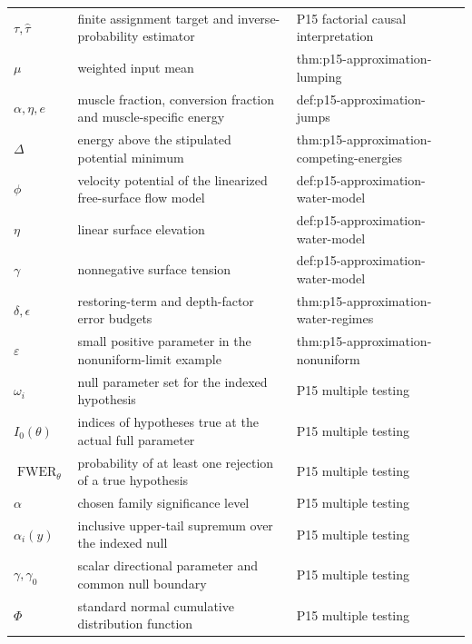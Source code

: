 \begin{longtable}{@{}p{}p{}p{}@{}}
\(\tau,\allowbreak \widehat\tau\) & finite assignment target and inverse-probability estimator & P15 factorial causal interpretation \\
\(\mu\) & weighted input mean & thm:\allowbreak{}p15-\allowbreak{}approximation-\allowbreak{}lumping \\
\(\alpha,\allowbreak \eta,\allowbreak e\) & muscle fraction, conversion fraction and muscle-specific energy & def:\allowbreak{}p15-\allowbreak{}approximation-\allowbreak{}jumps \\
\(\Delta\) & energy above the stipulated potential minimum & thm:\allowbreak{}p15-\allowbreak{}approximation-\allowbreak{}competing-\allowbreak{}energies \\
\(\phi\) & velocity potential of the linearized free-surface flow model & def:\allowbreak{}p15-\allowbreak{}approximation-\allowbreak{}water-\allowbreak{}model \\
\(\eta\) & linear surface elevation & def:\allowbreak{}p15-\allowbreak{}approximation-\allowbreak{}water-\allowbreak{}model \\
\(\gamma\) & nonnegative surface tension & def:\allowbreak{}p15-\allowbreak{}approximation-\allowbreak{}water-\allowbreak{}model \\
\(\delta,\allowbreak \epsilon\) & restoring-term and depth-factor error budgets & thm:\allowbreak{}p15-\allowbreak{}approximation-\allowbreak{}water-\allowbreak{}regimes \\
\(\varepsilon\) & small positive parameter in the nonuniform-limit example & thm:\allowbreak{}p15-\allowbreak{}approximation-\allowbreak{}nonuniform \\
\(\omega_i\) & null parameter set for the indexed hypothesis & P15 multiple testing \\
\(I_0(\theta)\) & indices of hypotheses true at the actual full parameter & P15 multiple testing \\
\(\operatorname{FWER}_\theta\) & probability of at least one rejection of a true hypothesis & P15 multiple testing \\
\(\alpha\) & chosen family significance level & P15 multiple testing \\
\(\alpha_i(y)\) & inclusive upper-tail supremum over the indexed null & P15 multiple testing \\
\(\gamma,\allowbreak \gamma_0\) & scalar directional parameter and common null boundary & P15 multiple testing \\
\(\Phi\) & standard normal cumulative distribution function & P15 multiple testing \\

\end{longtable}
